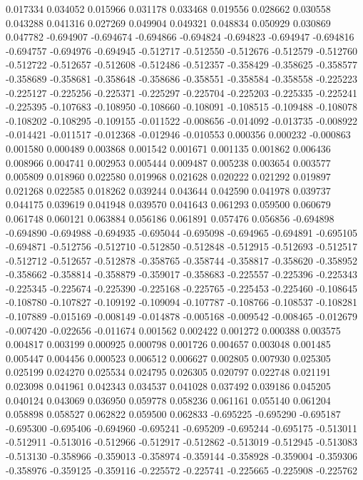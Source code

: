 0.017334
0.034052
0.015966
0.031178
0.033468
0.019556
0.028662
0.030558
0.043288
0.041316
0.027269
0.049904
0.049321
0.048834
0.050929
0.030869
0.047782
-0.694907
-0.694674
-0.694866
-0.694824
-0.694823
-0.694947
-0.694816
-0.694757
-0.694976
-0.694945
-0.512717
-0.512550
-0.512676
-0.512579
-0.512760
-0.512722
-0.512657
-0.512608
-0.512486
-0.512357
-0.358429
-0.358625
-0.358577
-0.358689
-0.358681
-0.358648
-0.358686
-0.358551
-0.358584
-0.358558
-0.225223
-0.225127
-0.225256
-0.225371
-0.225297
-0.225704
-0.225203
-0.225335
-0.225241
-0.225395
-0.107683
-0.108950
-0.108660
-0.108091
-0.108515
-0.109488
-0.108078
-0.108202
-0.108295
-0.109155
-0.011522
-0.008656
-0.014092
-0.013735
-0.008922
-0.014421
-0.011517
-0.012368
-0.012946
-0.010553
0.000356
0.000232
-0.000863
0.001580
0.000489
0.003868
0.001542
0.001671
0.001135
0.001862
0.006436
0.008966
0.004741
0.002953
0.005444
0.009487
0.005238
0.003654
0.003577
0.005809
0.018960
0.022580
0.019968
0.021628
0.020222
0.021292
0.019897
0.021268
0.022585
0.018262
0.039244
0.043644
0.042590
0.041978
0.039737
0.044175
0.039619
0.041948
0.039570
0.041643
0.061293
0.059500
0.060679
0.061748
0.060121
0.063884
0.056186
0.061891
0.057476
0.056856
-0.694898
-0.694890
-0.694988
-0.694935
-0.695044
-0.695098
-0.694965
-0.694891
-0.695105
-0.694871
-0.512756
-0.512710
-0.512850
-0.512848
-0.512915
-0.512693
-0.512517
-0.512712
-0.512657
-0.512878
-0.358765
-0.358744
-0.358817
-0.358620
-0.358952
-0.358662
-0.358814
-0.358879
-0.359017
-0.358683
-0.225557
-0.225396
-0.225343
-0.225345
-0.225674
-0.225390
-0.225168
-0.225765
-0.225453
-0.225460
-0.108645
-0.108780
-0.107827
-0.109192
-0.109094
-0.107787
-0.108766
-0.108537
-0.108281
-0.107889
-0.015169
-0.008149
-0.014878
-0.005168
-0.009542
-0.008465
-0.012679
-0.007420
-0.022656
-0.011674
0.001562
0.002422
0.001272
0.000388
0.003575
0.004817
0.003199
0.000925
0.000798
0.001726
0.004657
0.003048
0.001485
0.005447
0.004456
0.000523
0.006512
0.006627
0.002805
0.007930
0.025305
0.025199
0.024270
0.025534
0.024795
0.026305
0.020797
0.022748
0.021191
0.023098
0.041961
0.042343
0.034537
0.041028
0.037492
0.039186
0.045205
0.040124
0.043069
0.036950
0.059778
0.058236
0.061161
0.055140
0.061204
0.058898
0.058527
0.062822
0.059500
0.062833
-0.695225
-0.695290
-0.695187
-0.695300
-0.695406
-0.694960
-0.695241
-0.695209
-0.695244
-0.695175
-0.513011
-0.512911
-0.513016
-0.512966
-0.512917
-0.512862
-0.513019
-0.512945
-0.513083
-0.513130
-0.358966
-0.359013
-0.358974
-0.359144
-0.358928
-0.359004
-0.359306
-0.358976
-0.359125
-0.359116
-0.225572
-0.225741
-0.225665
-0.225908
-0.225762
